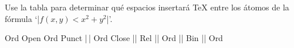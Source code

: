 

\bigskip

\enunciadoS Use la tabla para determinar qu\'e espacios insertar\'a
{\TeX} entre los \'atomos de la f\'ormula `|$f(x,y)<x^2+y^2$|'.

\bigskip

\respuestaS Ord Open Ord Punct |\,| Ord Close |\;| Rel |\;| Ord |\>| Bin |\>| Ord

\bye

